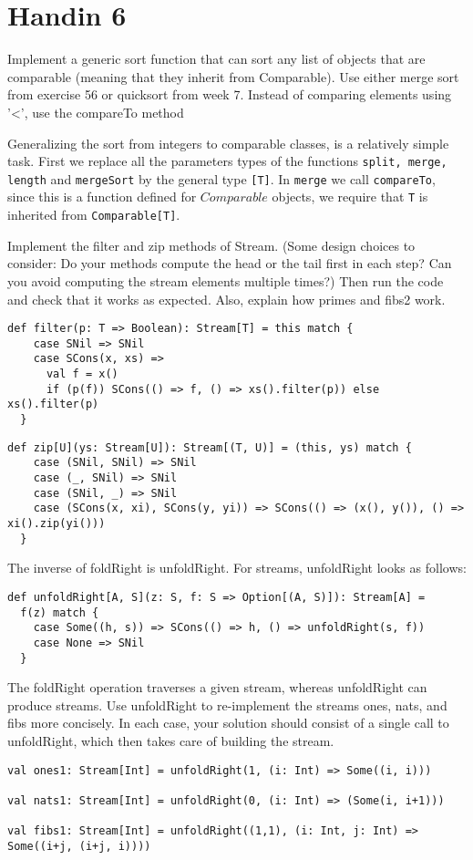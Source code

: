 \documentclass[working, oneside]{../../../Preambles/tuftebook}
\begin{document}
\let\cleardoublepage\clearpage
\thispagestyle{fancy}
\chapter{Handin 6}
\begin{exercise}[121]
Implement a generic sort function that can sort any list of objects that are comparable (meaning that they inherit from Comparable). Use either merge sort from exercise 56 or quicksort from week 7. Instead of comparing elements using '<', use the compareTo method
\end{exercise}
\begin{solution}
Generalizing the sort from integers to comparable classes, is a relatively simple task. First we replace all the parameters types of the functions  \texttt{split, merge, length} and \texttt{mergeSort} by the general type \texttt{[T]}. In \texttt{merge} we call \texttt{compareTo}, since this is a function defined for $Comparable$ objects, we require that \texttt{T} is inherited from \texttt{Comparable[T]}.
\end{solution}
\begin{exercise}[122]
Implement the filter and zip methods of Stream. (Some design choices to consider: Do your methods compute the head or the tail first in each step? Can you avoid computing the stream elements multiple times?) Then run the code and check that it works as expected. Also, explain how primes and fibs2 work.
\end{exercise}
\begin{solution}
\begin{lstlisting}
def filter(p: T => Boolean): Stream[T] = this match {
    case SNil => SNil
    case SCons(x, xs) =>
      val f = x()
      if (p(f)) SCons(() => f, () => xs().filter(p)) else xs().filter(p)
  }
\end{lstlisting}
\begin{lstlisting}
def zip[U](ys: Stream[U]): Stream[(T, U)] = (this, ys) match {
    case (SNil, SNil) => SNil
    case (_, SNil) => SNil
    case (SNil, _) => SNil
    case (SCons(x, xi), SCons(y, yi)) => SCons(() => (x(), y()), () => xi().zip(yi()))
  }
\end{lstlisting}
\end{solution}
\begin{exercise}[127]
The inverse of foldRight is unfoldRight. For streams, unfoldRight looks as follows:
\begin{lstlisting}
def unfoldRight[A, S](z: S, f: S => Option[(A, S)]): Stream[A] =
  f(z) match {
    case Some((h, s)) => SCons(() => h, () => unfoldRight(s, f))
    case None => SNil
  }
\end{lstlisting}
The foldRight operation traverses a given stream, whereas unfoldRight can produce streams. Use unfoldRight to re-implement the streams ones, nats, and fibs more concisely. In each case, your solution should consist of a single call to unfoldRight, which then takes care of building the stream.
\end{exercise}
\begin{solution}
\begin{lstlisting}
val ones1: Stream[Int] = unfoldRight(1, (i: Int) => Some((i, i)))

val nats1: Stream[Int] = unfoldRight(0, (i: Int) => (Some(i, i+1)))

val fibs1: Stream[Int] = unfoldRight((1,1), (i: Int, j: Int) => Some((i+j, (i+j, i))))
\end{lstlisting}
\end{solution}
\end{document}
